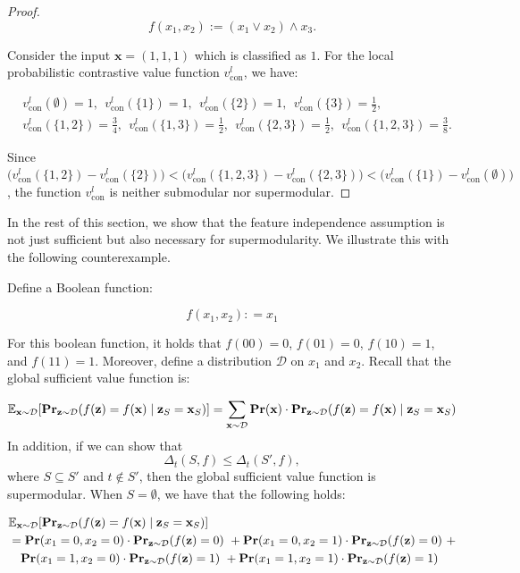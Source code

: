 \documentclass{article}
\newcommand{\z}{\textbf{z}}
\newcommand{\x}{\textbf{x}}
\newcommand{\mbf}[1]{\ensuremath\mathbf{#1}}
\newcommand{\mbb}[1]{\ensuremath\mathbb{#1}}
\begin{document}
\begin{proof}
\begin{equation}
f(x_1,x_2):= (x_1 \lor x_2) \land x_3.
\end{equation}

Consider the input $\x = (1,1,1)$ which is classified as $1$. For the local probabilistic contrastive value function $v^{l}_{\text{con}}$, we have:

\begin{align*}
&v^{l}_{\text{con}}(\emptyset) = 1,~~v^{l}_{\text{con}}(\{1\}) = 1,~~v^{l}_{\text{con}}(\{2\}) = 1,~~v^{l}_{\text{con}}(\{3\}) = \frac{1}{2}, \\
&v^{l}_{\text{con}}(\{1,2\}) = \frac{3}{4},~~v^{l}_{\text{con}}(\{1,3\}) = \frac{1}{2},~~v^{l}_{\text{con}}(\{2,3\}) = \frac{1}{2},~~v^{l}_{\text{con}}(\{1,2,3\}) = \frac{3}{8}.
\end{align*}


Since $\bigl(v^{l}_{\text{con}}(\{1,2\}) - v^{l}_{\text{con}}(\{2\})\bigr) < \bigl(v^{l}_{\text{con}}(\{1,2,3\}) - v^{l}_{\text{con}}(\{2,3\})\bigr) < \bigl(v^{l}_{\text{con}}(\{1\}) - v^{l}_{\text{con}}(\emptyset)\bigr)$,
the function $v^{l}_{\text{con}}$ is neither submodular nor supermodular.

\end{proof}

In the rest of this section, we show that the feature independence assumption is not just sufficient but also necessary for supermodularity. We illustrate this with the following counterexample.

Define a Boolean function:

\begin{equation}
f(x_1, x_2): = x_1
\end{equation}

For this boolean function, it holds that $f(00) = 0$, $f(01) = 0$, $f(10) = 1$, and $f(11) = 1$. Moreover, define a distribution $\mathcal{D}$ on $x_1$ and $x_2$. Recall that the global sufficient value function is:

\[
\mbb{E}_{\x\sim \mathcal{D}}[\mbf{Pr}_{\z\sim \mathcal{D}}(f(\z) = f(\x) \mid \z_{S} = \x_{S})]
= \sum_{\x\sim \mathcal{D}} \mbf{Pr}(\x) \cdot \mbf{Pr}_{\z\sim \mathcal{D}}(f(\z) = f(\x) \mid \z_{S} = \x_{S})
\]
%
In addition, if we can show that
\[
\Delta_{t}(S,f) \le \Delta_{t}(S',f),
\]
where $S\subseteq S'$ and $t \not\in S'$, then the global sufficient value function is supermodular. When $S = \emptyset$, we have that the following holds:

\begin{equation*}
\begin{aligned}
&\mbb{E}_{\x\sim \mathcal{D}}[\mbf{Pr}_{\z\sim \mathcal{D}}(f(\z) = f(\x) \mid \z_{S} = \x_{S})] \\
&= \mbf{Pr}(x_1 = 0, x_2 = 0) \cdot \mbf{Pr}_{\z\sim \mathcal{D}}(f(\z) = 0) \ + \mbf{Pr}(x_1 = 0, x_2 = 1) \cdot \mbf{Pr}_{\z\sim \mathcal{D}}(f(\z) = 0) \ + \\
&\hspace{1em} \mbf{Pr}(x_1 = 1, x_2 = 0) \cdot \mbf{Pr}_{\z\sim \mathcal{D}}(f(\z) = 1) \ + 
\mbf{Pr}(x_1 = 1, x_2 = 1) \cdot \mbf{Pr}_{\z\sim \mathcal{D}}(f(\z) = 1) 
\end{aligned}
\end{equation*}
\end{document}
